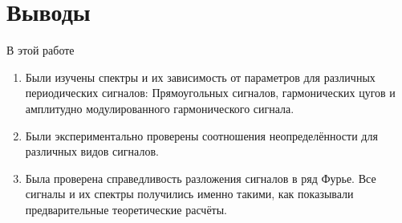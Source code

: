 \documentclass{article}
\begin{document}
\section{Выводы}

В этой работе

\begin{enumerate}
    \item Были изучены спектры и их зависимость от параметров для различных периодических
сигналов: Прямоугольных сигналов, гармонических цугов и амплитудно модулированного
гармонического сигнала.
    \item Были экспериментально проверены соотношения неопределённости
для различных видов сигналов.
    \item Была проверена справедливость разложения сигналов в ряд Фурье. Все сигналы и их спектры получились
именно такими, как показывали предварительные теоретические расчёты.
\end{enumerate}
\end{document}
